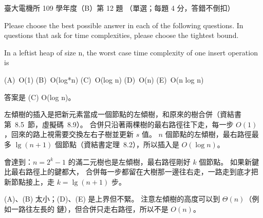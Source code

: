 \begin{pastexam}[label={px:ntu-109-ee-ds-12}]{臺大電機所 109 學年度（B）第 12 題}
（單選；每題 4 分，答錯不倒扣）

Please choose the best possible answer in each of the following questions. In questions that ask
for time complexities, please choose the tightest bound.

In a leftist heap of size n, the worst case time complexity of one insert operation is

(A)~O(1) \qquad (B)~O(log*n) \qquad (C)~O(log n) \qquad (D)~O(n) \qquad (E)~O(n log n)
\end{pastexam}

\begin{pastsoln}
答案是 (C) O(log n)。

左傾樹的插入是把新元素當成一個節點的左傾樹，和原來的樹合併（資結書第~8.5~節，虛擬碼~8.9）。
合併只沿著兩棵樹的最右路徑往下走，每一步 $O(1)$，回來的路上視需要交換左右子樹並更新 $s$ 值。
$n$ 個節點的左傾樹，最右路徑最多 $\lg(n + 1)$ 個節點（資結書定理~8.2），所以插入是 $O(\log n)$。

會達到：$n = 2^k - 1$ 的滿二元樹也是左傾樹，最右路徑剛好 $k$ 個節點。 如果新鍵比最右路徑上的鍵都大，
合併每一步都留在大樹那一邊往右走，一路走到底才把新節點接上，走 $k = \lg(n+1)$ 步。

(A)、(B) 太小；(D)、(E) 是上界但不緊。 注意左傾樹的高度可以到 $\Theta(n)$（例如一路往左長的
鏈），但合併只走右路徑，所以不是 $O(n)$。
\end{pastsoln}
